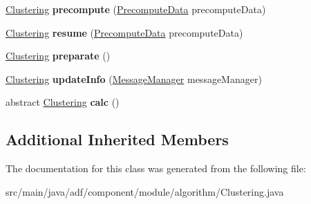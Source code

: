 \begin{DoxyCompactItemize}
\hypertarget{classadf_1_1component_1_1module_1_1algorithm_1_1Clustering_aa7924939f7d3f73322619ba5d60f2ea1}{}\label{classadf_1_1component_1_1module_1_1algorithm_1_1Clustering_aa7924939f7d3f73322619ba5d60f2ea1} 
\hyperlink{classadf_1_1component_1_1module_1_1algorithm_1_1Clustering}{Clustering} {\bfseries precompute} (\hyperlink{classadf_1_1agent_1_1precompute_1_1PrecomputeData}{Precompute\+Data} precompute\+Data)
\item 
\hypertarget{classadf_1_1component_1_1module_1_1algorithm_1_1Clustering_ab3e78f078f6b73a8581dab6fb64a13ad}{}\label{classadf_1_1component_1_1module_1_1algorithm_1_1Clustering_ab3e78f078f6b73a8581dab6fb64a13ad} 
\hyperlink{classadf_1_1component_1_1module_1_1algorithm_1_1Clustering}{Clustering} {\bfseries resume} (\hyperlink{classadf_1_1agent_1_1precompute_1_1PrecomputeData}{Precompute\+Data} precompute\+Data)
\item 
\hypertarget{classadf_1_1component_1_1module_1_1algorithm_1_1Clustering_a7d4daee07eecc0fb80f9dcc070dbfd42}{}\label{classadf_1_1component_1_1module_1_1algorithm_1_1Clustering_a7d4daee07eecc0fb80f9dcc070dbfd42} 
\hyperlink{classadf_1_1component_1_1module_1_1algorithm_1_1Clustering}{Clustering} {\bfseries preparate} ()
\item 
\hypertarget{classadf_1_1component_1_1module_1_1algorithm_1_1Clustering_a9518f4cfcc587897cf05170f399d1a7c}{}\label{classadf_1_1component_1_1module_1_1algorithm_1_1Clustering_a9518f4cfcc587897cf05170f399d1a7c} 
\hyperlink{classadf_1_1component_1_1module_1_1algorithm_1_1Clustering}{Clustering} {\bfseries update\+Info} (\hyperlink{classadf_1_1agent_1_1communication_1_1MessageManager}{Message\+Manager} message\+Manager)
\item 
\hypertarget{classadf_1_1component_1_1module_1_1algorithm_1_1Clustering_ab0323479531d10738a0cf25a3b5d3117}{}\label{classadf_1_1component_1_1module_1_1algorithm_1_1Clustering_ab0323479531d10738a0cf25a3b5d3117} 
abstract \hyperlink{classadf_1_1component_1_1module_1_1algorithm_1_1Clustering}{Clustering} {\bfseries calc} ()
\end{DoxyCompactItemize}
\subsection*{Additional Inherited Members}


The documentation for this class was generated from the following file\+:\begin{DoxyCompactItemize}
\item 
src/main/java/adf/component/module/algorithm/Clustering.\+java\end{DoxyCompactItemize}
